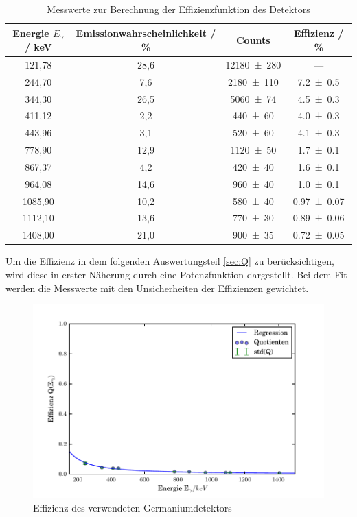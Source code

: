 \begin{table}
  \centering
  \begin{tabular}{c| c c c}
     \toprule
    	Energie $E_{\gamma}$ / keV& Emissionwahrscheinlichkeit / \% \cite{V18}& Counts & Effizienz / \% \\
     \midrule
     121,78  &28,6 &\num{12180 +- 280} 	& ---	\\
     244,70  &7,6  &\num{2180 +- 110} 	& \num{7,2 +- 0,5}	\\
     344,30  &26,5 &\num{5060 +- 74} 	& \num{4,5 +- 0,3} 	\\
     411,12  &2,2  &\num{440 +- 60} 	& \num{4,0 +- 0,3} 	\\
     443,96  &3,1  &\num{520 +- 60} 	& \num{4,1 +- 0,3} 	\\
     778,90  &12,9 &\num{1120 +- 50}	& \num{1,7 +- 0,1}	\\
     867,37  &4,2  &\num{420 +- 40} 	& \num{1,6 +- 0,1}	\\
     964,08  &14,6 &\num{960 +- 40} 	& \num{1,0 +- 0,1}	\\
     1085,90 &10,2 &\num{580 +- 40} 	& \num{0,97 +- 0,07}	\\
     1112,10 &13,6 &\num{770 +- 30} 	& \num{0,89 +- 0,06}	\\
     1408,00 &21,0 &\num{900 +- 35} 	& \num{0,72 +- 0,05}	\\
     \bottomrule
  \end{tabular}
  \caption{Messwerte zur Berechnung der Effizienzfunktion des Detektors}
  \label{tab:<+label+>}
\end{table}

Um die Effizienz in dem folgenden Auswertungsteil \ref{sec:Q} zu berücksichtigen, wird diese in erster Näherung durch eine Potenzfunktion dargestellt. Bei dem Fit werden die Messwerte mit den Unsicherheiten der Effizienzen gewichtet.

\begin{figure}[H]
  \centering
  \includegraphics[width=\textwidth]{./build/Effizienz.pdf}
  \caption{Effizienz des verwendeten Germaniumdetektors}
  \label{fig:Efi}
\end{figure}

